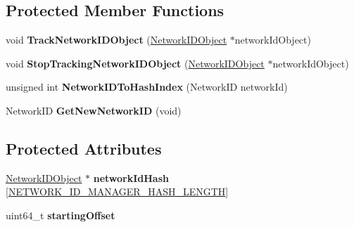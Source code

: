 \subsection*{Protected Member Functions}
\begin{DoxyCompactItemize}
\item 
\hypertarget{class_rak_net_1_1_network_i_d_manager_ae5d6d623918744ea76a3b7549eba72f6}{void {\bfseries Track\-Network\-I\-D\-Object} (\hyperlink{class_rak_net_1_1_network_i_d_object}{Network\-I\-D\-Object} $\ast$network\-Id\-Object)}\label{class_rak_net_1_1_network_i_d_manager_ae5d6d623918744ea76a3b7549eba72f6}

\item 
\hypertarget{class_rak_net_1_1_network_i_d_manager_a24a2c1ab407a9dc93f191e3965a48689}{void {\bfseries Stop\-Tracking\-Network\-I\-D\-Object} (\hyperlink{class_rak_net_1_1_network_i_d_object}{Network\-I\-D\-Object} $\ast$network\-Id\-Object)}\label{class_rak_net_1_1_network_i_d_manager_a24a2c1ab407a9dc93f191e3965a48689}

\item 
\hypertarget{class_rak_net_1_1_network_i_d_manager_afdb27eb77e65ccaeb6e29e049da75636}{unsigned int {\bfseries Network\-I\-D\-To\-Hash\-Index} (Network\-I\-D network\-Id)}\label{class_rak_net_1_1_network_i_d_manager_afdb27eb77e65ccaeb6e29e049da75636}

\item 
\hypertarget{class_rak_net_1_1_network_i_d_manager_a26f431cc1262563f45946fbe3bb72c28}{Network\-I\-D {\bfseries Get\-New\-Network\-I\-D} (void)}\label{class_rak_net_1_1_network_i_d_manager_a26f431cc1262563f45946fbe3bb72c28}

\end{DoxyCompactItemize}
\subsection*{Protected Attributes}
\begin{DoxyCompactItemize}
\item 
\hypertarget{class_rak_net_1_1_network_i_d_manager_a9e213a97f9081fab78fa0bcdeb490caa}{\hyperlink{class_rak_net_1_1_network_i_d_object}{Network\-I\-D\-Object} $\ast$ {\bfseries network\-Id\-Hash} \mbox{[}\hyperlink{_network_i_d_manager_8h_ab76726a4181b4036fa5dc1e1f099561c}{N\-E\-T\-W\-O\-R\-K\-\_\-\-I\-D\-\_\-\-M\-A\-N\-A\-G\-E\-R\-\_\-\-H\-A\-S\-H\-\_\-\-L\-E\-N\-G\-T\-H}\mbox{]}}\label{class_rak_net_1_1_network_i_d_manager_a9e213a97f9081fab78fa0bcdeb490caa}

\item 
\hypertarget{class_rak_net_1_1_network_i_d_manager_a3254c298c745f695675887cb1c2e24dc}{uint64\-\_\-t {\bfseries starting\-Offset}}\label{class_rak_net_1_1_network_i_d_manager_a3254c298c745f695675887cb1c2e24dc}

\end{DoxyCompactItemize}
